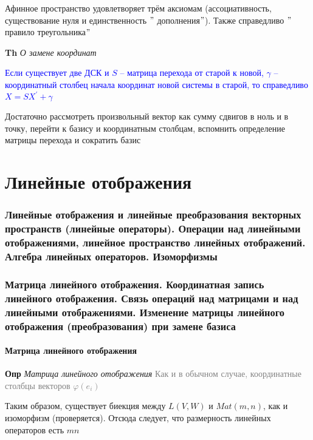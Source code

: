 \documentclass[a4paper, 14pt]{article}
\begin{document}
    Афинное пространство удовлетворяет трём аксиомам (ассоциативность, существование нуля и единственность \("\)
    дополнения\("\)). Также справедливо \("\)правило треугольника\("\)

    \textbf{Th} \textit{О замене координат}

    \textcolor{blue}{Если существует две ДСК и $S$ -- матрица перехода от старой к новой, $\gamma$
        -- координатный столбец начала координат новой системы в старой, то справедливо $X = SX^{'} + \gamma$}

    Достаточно рассмотреть произвольный вектор как сумму сдвигов в ноль и в точку, перейти к базису и координатным
    столбцам, вспомнить определение матрицы перехода и сократить базис

     \part*{Линейные отображения}

    \section{Линейные отображения и линейные преобразования векторных пространств (линейные операторы).
    Операции над линейными отображениями, линейное пространство линейных отображений.
    Алгебра линейных операторов.
    Изоморфизмы}

    

    \section{Матрица линейного отображения.
    Координатная запись линейного отображения.
    Связь операций над матрицами и над линейными отображениями.
    Изменение матрицы линейного отображения (преобразования) при замене базиса}

    \subsection{Матрица линейного отображения}

    \textbf{Опр} \textit{Матрица линейного отображения} \textcolor{gray}{Как и в обычном случае, координатные столбцы
    векторов $\varphi(e_i)$}

    Таким образом, существует биекция между $L(V, W)$ и $Mat(m, n)$, как и изоморфизм (проверяется).
    Отсюда следует, что размерность линейных операторов есть $mn$
\end{document}
